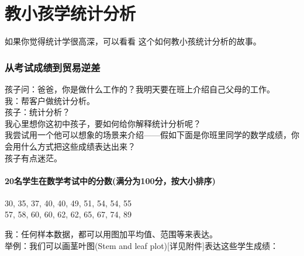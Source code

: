 \chapter{教小孩学统计分析} %

如果你觉得统计学很高深，可以看看 这个如何教小孩统计分析的故事。


\hypertarget{ux5982ux4f55ux753bux830eux53f6ux56festem-and-leaf-plot}{%
\subsection{从考试成绩到贸易逆差}\label{ux5982ux4f55ux753bux830eux53f6ux56festem-and-leaf-plot}}

孩子问：爸爸，你是做什么工作的？我明天要在班上介绍自己父母的工作。\\
我：帮客户做统计分析。\\
孩子：统计分析？\\
我心里想你这初中孩子，要如何给你解释统计分析呢？\\
我尝试用一个他可以想象的场景来介绍------假如下面是你班里同学的数学成绩，你会用什么方式把这些成绩表达出来？\\
孩子有点迷茫。\\

\hypertarget{ux6bd4ux8f83ux4e09ux79cdux6559ux5b66ux65b9ux6cd5}{%
\subsubsection{20名学生在数学考试中的分数(满分为100分，按大小排序)}\label{ux6bd4ux8f83ux4e09ux79cdux6559ux5b66ux65b9ux6cd5}}

30, 35, 37, 40, 40, 49, 51, 54, 54, 55\\
57, 58, 60, 60, 62, 62, 65, 67, 74, 89

我：任何样本数据，都可以用图加平均值、范围等来表达。\\
举例：我们可以画茎叶图(Stem and leaf
plot){[}详见附件{]}表达这些学生成绩：\\


